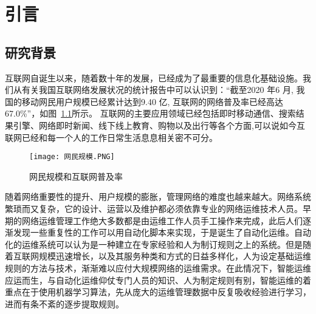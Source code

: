 
\chapter{引言}


\section{研究背景}

互联网自诞生以来，随着数十年的发展，已经成为了最重要的信息化基础设施。我们从有关我国互联网络发展状况的统计报告\cite{cac.gov}中可以认识到：“截至2020 年6 月, 我国的移动网民用户规模已经累计达到9.40 亿, 互联网的网络普及率已经高达67.0\%”，如图~\ref{fig:网民规模和互联网普及率}所示。
互联网的主要应用领域已经包括即时移动通信、搜索结果引擎、网络即时新闻、线下线上教育、购物以及出行等各个方面,可以说如今互联网已经和每一个人的工作日常生活息息相关密不可分。



\begin{figure}
    \centering
    \texttt{[image: 网民规模.PNG]}
    \caption{网民规模和互联网普及率}
    \label{fig:网民规模和互联网普及率}
  \end{figure}

随着网络重要性的提升、用户规模的膨胀，管理网络的难度也越来越大。网络系统繁琐而又复杂，它的设计、运营以及维护都必须依靠专业的网络运维技术人员。早期的网络运维管理工作绝大多数都是由运维工作人员手工操作来完成，此后人们逐渐发现一些重复性的工作可以用自动化脚本来实现，于是诞生了自动化运维。自动化的运维系统可以认为是一种建立在专家经验和人为制订规则之上的系统。但是随着互联网规模迅速增长，以及其服务种类和方式的日益多样化，人为设定基础运维规则的方法与技术，渐渐难以应付大规模网络的运维需求。在此情况下，智能运维应运而生，与自动化运维仰仗专门人员的知识、人为制定规则有别，智能运维的着重点在于使用机器学习算法，先从庞大的运维管理数据中反复吸收经验进行学习，进而有条不紊的逐步提取规则。


